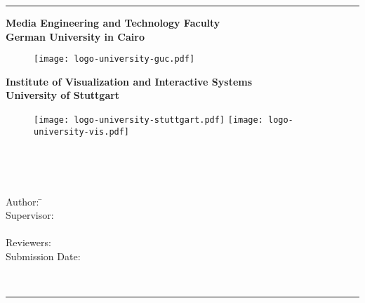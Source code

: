 \thispagestyle{empty}
\begin{center}
	\hrule
	\vspace{1cm}
	{\Large \bf Media Engineering and Technology Faculty}\\ %
	\vspace{0.3cm}
	{\Large \bf German University in Cairo}\\ %
	\begin{figure}[htb]
		\centering
		\texttt{[image: logo-university-guc.pdf]}
	\end{figure}
	
	\vspace{0.5cm}
	
	{\Large \bf Institute of Visualization and Interactive Systems}\\ %
	\vspace{0.3cm}
	{\Large \bf University of Stuttgart}\\ %
	
	\begin{figure}[htb]
		\centering
		\texttt{[image: logo-university-stuttgart.pdf]}
		\texttt{[image: logo-university-vis.pdf]}
	\end{figure}
	
	\vspace{2cm}
	
	{\Large \bf \titleOfThesisOne}\\
	\vspace{1cm}
	
	{\large \bf \typeOfThesis}\\
	\vspace{4cm}
	
	\parbox{2.5cm}{
			\begin{tabbing}
				Author: \hspace{2cm}
					\=\authorOfThesis\\[2mm]
				Supervisor: 
					\>\supervisorOne\\[2mm]
					\>\supervisorTwo\\[2mm]
				Reviewers: 
					\>\reviewerOne\\[1mm]
				Submission Date: 
					\>\submissionDate\\
			\end{tabbing}
	}\\
	\hrule
\end{center}
